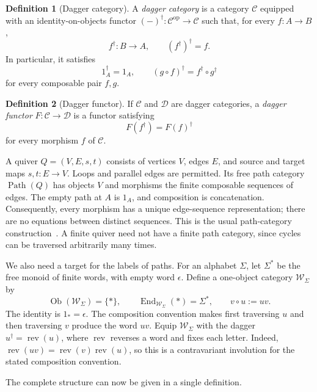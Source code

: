 \documentclass[11pt,a4paper]{article}
\theoremstyle{definition}
\newtheorem{definition}{Definition}[section]
\theoremstyle{plain}
\newcommand{\Path}{\operatorname{Path}}
\newcommand{\rev}{\operatorname{rev}}
\newcommand{\WW}{\mathcal W}
\begin{document}
\begin{definition}[Dagger category]
A \emph{dagger category} is a category $\mathcal C$ equipped with an
identity-on-objects functor
$(-)^\dagger:\mathcal C^{\mathrm{op}}\to\mathcal C$ such that, for every
$f:A\to B$,
\[
 f^\dagger:B\to A,\qquad (f^\dagger)^\dagger=f.
\]
In particular, it satisfies
\[
 1_A^\dagger=1_A,
 \qquad (g\circ f)^\dagger=f^\dagger\circ g^\dagger
\]
for every composable pair $f,g$.
\end{definition}

\begin{definition}[Dagger functor]
If $\mathcal C$ and $\mathcal D$ are dagger categories, a
\emph{dagger functor} $F:\mathcal C\to\mathcal D$ is a functor satisfying
\[
 F(f^\dagger)=F(f)^\dagger
\]
for every morphism $f$ of $\mathcal C$.
\end{definition}

A quiver $Q=(V,E,s,t)$ consists of vertices $V$, edges $E$, and source
and target maps $s,t:E\to V$. Loops and parallel edges are permitted.
Its free path category $\Path(Q)$ has objects $V$ and morphisms the
finite composable sequences of edges. The empty path at $A$ is $1_A$,
and composition is concatenation. Consequently, every morphism has a
unique edge-sequence representation; there are no equations between
distinct sequences. This is the usual path-category
construction~\cite{pathcat}. A finite quiver need not have a finite
path category, since cycles can be traversed arbitrarily many times.

We also need a target for the labels of paths. For an alphabet $\Sigma$,
let $\Sigma^*$ be the free monoid of finite words, with empty word
$\epsilon$. Define a one-object category $\WW_\Sigma$ by
\[
 \operatorname{Ob}(\WW_\Sigma)=\{*\},\qquad
 \operatorname{End}_{\WW_\Sigma}(*)=\Sigma^*,\qquad
 v\circ u:=uv.
\]
The identity is $1_*=\epsilon$. The composition convention makes first
traversing $u$ and then traversing $v$ produce the word $uv$.
Equip $\WW_\Sigma$ with the dagger
$u^\dagger=\rev(u)$, where $\rev$ reverses a word and fixes each letter.
Indeed, $\rev(uv)=\rev(v)\rev(u)$, so this is a contravariant involution
for the stated composition convention.

The complete structure can now be given in a single definition.
\end{document}
